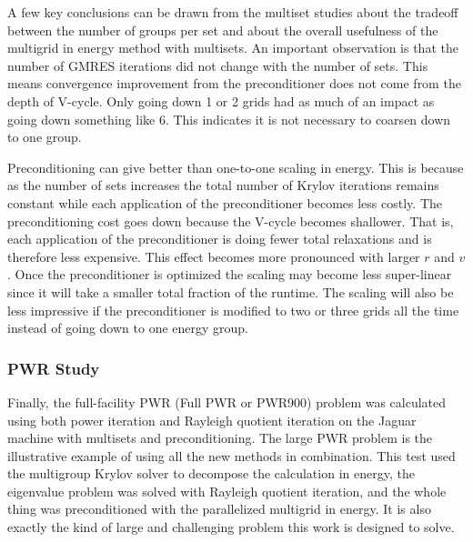 A few key conclusions can be drawn from the multiset studies about the tradeoff between the number of groups per set and about the overall usefulness of the multigrid in energy method with multisets. An important observation is that the number of GMRES iterations did not change with the number of sets. This means convergence improvement from the preconditioner does not come from the depth of V-cycle. Only going down 1 or 2 grids had as much of an impact as going down something like 6. This indicates it is not necessary to coarsen down to one group. 

Preconditioning can give better than one-to-one scaling in energy. This is because as the number of sets increases the total number of Krylov iterations remains constant while each application of the preconditioner becomes less costly. The preconditioning cost goes down because the V-cycle becomes shallower. That is, each application of the preconditioner is doing fewer total relaxations and is therefore less expensive. This effect becomes more pronounced with larger $r$ and $v$. Once the preconditioner is optimized the scaling may become less super-linear since it will take a smaller total fraction of the runtime. The scaling will also be less impressive if the preconditioner is modified to two or three grids all the time instead of going down to one energy group.

\subsubsection{PWR Study}
Finally, the full-facility PWR (Full PWR or PWR900) problem was calculated using both power iteration and Rayleigh quotient iteration on the Jaguar machine with multisets and preconditioning. The large PWR problem is the illustrative example of using all the new methods in combination. This test used the multigroup Krylov solver to decompose the calculation in energy, the eigenvalue problem was solved with Rayleigh quotient iteration, and the whole thing was preconditioned with the parallelized multigrid in energy. It is also exactly the kind of large and challenging problem this work is designed to solve. %

